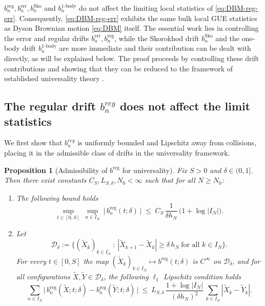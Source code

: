 \documentclass[12pt,reqno]{amsart}
\theoremstyle{plain}
\newtheorem{prop}{Proposition}[section]
\theoremstyle{definition}
\theoremstyle{remark}
\begin{document}
$b^{\mathrm{reg}}_n, b^{\mathrm{err}}_n, b_n^{\mathrm{Sko}}$ and $b^{\mathrm{1\text{-}body}}_n$ 
do not affect the limiting local statistics of \eqref{eq:DBM-reg-err}. 
Consequently, \eqref{eq:DBM-reg-err} exhibits the same bulk local GUE statistics as 
Dyson Brownian motion \eqref{eq:DBM} itself. 
The essential work lies in controlling the error and regular drifts $b^{\mathrm{err}}_n, b^{\mathrm{reg}}_n$, while the Skorokhod drift $b^{\mathrm{Sko}}_n$ and the one-body drift $b^{\mathrm{1\text{-}body}}_n$ are more immediate and their contribution can be dealt with directly, as will be explained below. 
The proof proceeds by controlling these drift contributions and showing that they can be reduced to the framework of established universality theory 
\cite{ErdosYau2012,BourgadeErdosYau2014,LandonSosoeYau2017}.



\subsection{The regular drift $b^{reg}_n$ does not affect the limit statistics} We first show that $b_n^{reg}$ is uniformly bounded and Lipschitz away from collisions, placing it in the admissible class of drifts in the universality framework.

\begin{prop}[Admissibility of $b^{\mathrm{reg}}$ for universality]
\label{prop:breg-regular-cut}
Fix $S>0$ and $\delta\in(0,1]$. Then there exist constants
$C_{S},L_{S,\delta},N_0<\infty$ such that for all
$N\ge N_0$:

\begin{enumerate}
\item[(i)] The following bound holds 
\begin{equation}\label{eq:breg-sup-cut}
\sup_{t\in[0,S]}\ \sup_{n\in I_N}\ \big|\,b^{\mathrm{reg}}_{n}(t;\delta)\,\big|
\;\le\; C_{S}\,\frac{1}{\delta h_N}\,\big(1+\log |I_N|\big).
\end{equation}

\item[(ii)] Let
\begin{equation}\label{eq:D-delta}
\mathcal D_{\delta}:=\Big\{(\widetilde X_k)_{k\in I_N}\ :\
|\widetilde X_{k+1}-\widetilde X_k|\ge \delta\,h_N\ \text{for all }k\in I_N\Big\}.
\end{equation}
For every $t\in[0,S]$ the map
$(\widetilde X_k)_{k\in I_N}\mapsto b^{\mathrm{reg}}(t;\delta)$ is $C^\infty$
on $\mathcal D_\delta$, and for all configurations
$\widetilde X,\widetilde Y\in\mathcal D_\delta$,  the following $\ell_1$ Lipschitz condition holds
\begin{equation}\label{eq:breg-Lip}
\sum_{n\in I_N}\big|\,b^{\mathrm{reg}}_{n}(\widetilde X;t;\delta)
-b^{\mathrm{reg}}_{n}(\widetilde Y;t;\delta)\,\big|
\ \le\ L_{S,\delta}\,
\frac{1+\log |I_N|}{(\delta h_N)^2}\,
\sum_{k\in I_N}|\widetilde X_k-\widetilde Y_k| .
\end{equation}
\end{enumerate}
\end{prop}
\end{document}
